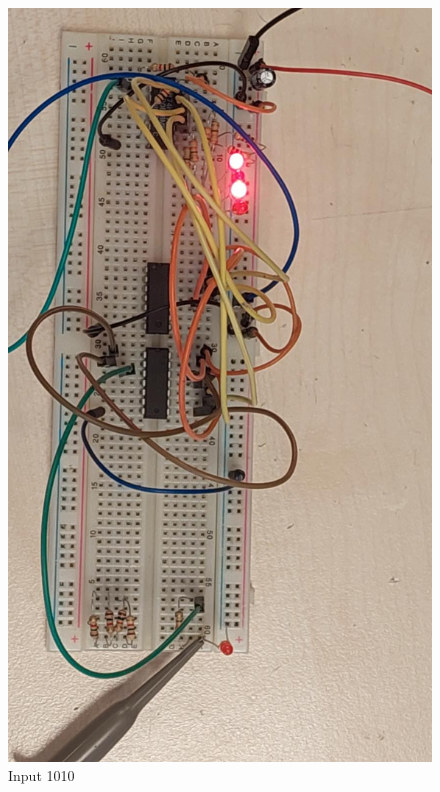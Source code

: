 \documentclass[a4paper, 12pt]{article}
\begin{document}
\begin{figure}
	\centering
	\includegraphics[width=\textwidth]{led-off.jpg}
	\caption{Input 1010}
\end{figure}
\end{document}
